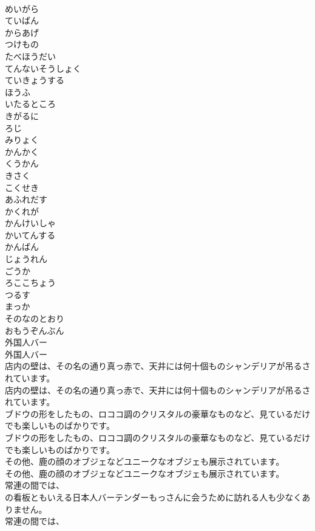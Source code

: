 \documentclass[8pt]{extreport}
\begin{document}
\begin{CJK}{UTF8}{min}
\\	めいがら
\\	ていばん
\\	からあげ
\\	つけもの
\\	たべほうだい
\\	てんないそうしょく
\\	ていきょうする
\\	ほうふ
\\	いたるところ
\\	きがるに
\\	ろじ
\\	みりょく
\\	かんかく
\\	くうかん
\\	きさく
\\	こくせき
\\	あふれだす
\\	かくれが
\\	かんけいしゃ
\\	かいてんする
\\	かんばん
\\	じょうれん
\\	ごうか
\\	ろここちょう
\\	つるす
\\	まっか
\\	そのなのとおり
\\	おもうぞんぶん
\\	外国人バー	
\\	外国人バー 
\\	店内の壁は、その名の通り真っ赤で、天井には何十個ものシャンデリアが吊るされています。	
\\	店内の壁は、その名の通り真っ赤で、天井には何十個ものシャンデリアが吊るされています。 
\\	ブドウの形をしたもの、ロココ調のクリスタルの豪華なものなど、見ているだけでも楽しいものばかりです。	
\\	ブドウの形をしたもの、ロココ調のクリスタルの豪華なものなど、見ているだけでも楽しいものばかりです。 
\\	その他、鹿の顔のオブジェなどユニークなオブジェも展示されています。	
\\	その他、鹿の顔のオブジェなどユニークなオブジェも展示されています。 
\\	常連の間では、
\\	の看板ともいえる日本人バーテンダーもっさんに会うために訪れる人も少なくありません。	
\\	常連の間では、

\end{CJK}
\end{document}
